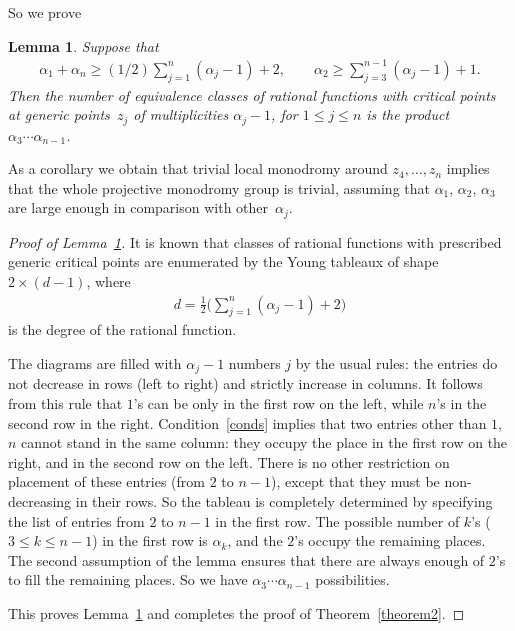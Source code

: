 \documentclass[pdftex]{sigma}
\numberwithin{equation}{section}
\newtheorem{lem}[thm]{Lemma}
 { \theoremstyle{definition}
\newtheorem{Remark}[thm]{Remark} }
\def\lc{,\allowbreak\ldots,\allowbreak}
\begin{document}
So we prove

\begin{lem}\label{lem2}
Suppose that
\begin{gather}\label{conds}
\alpha_1+\alpha_n\geq (1/2)\sum_{j=1}^n(\alpha_j-1)+2,\qquad \alpha_2\geq\sum_{j=3}^{n-1}(\alpha_j-1)+1.
\end{gather}
Then the number of equivalence classes of rational functions with critical points at generic points~$z_j$ of multiplicities $\alpha_j-1$, for $1\leq j\leq n$ is the product $\alpha_3\cdots\alpha_{n-1}$.
\end{lem}

As a corollary we obtain that trivial local monodromy around $z_4\lc z_n$ implies that the whole projective monodromy group is trivial, assuming that $\alpha_1$, $\alpha_2$, $\alpha_3$ are large enough in comparison with
other~$\alpha_j$.

\begin{proof}[Proof of Lemma~\ref{lem2}]It is known \cite{EGSV} that classes of rational functions with prescribed generic critical points are enumerated by the Young tableaux of shape $2\times (d-1)$, where
\begin{gather*}
d=\frac12 \biggl(\sum_{j=1}^n(\alpha_j-1)+2\biggr)
\end{gather*}
is the degree of the rational function.

The diagrams are filled with $\alpha_j-1$ numbers $j$ by the usual rules: the entries do not decrease in rows (left to right) and strictly increase in columns. It follows from this rule that $1$'s can be only in the first row on the left, while $n$'s in the second row in the right. Condition~\eqref{conds} implies that two entries other than $1$, $n$ cannot stand in the same column: they occupy the place in the first row on the right, and in the second row on the left. There is no other restriction on placement of these entries (from $2$ to $n-1$), except that they must be non-decreasing in their rows. So the tableau is completely determined by specifying the list of entries from $2$ to $n-1$ in the first row. The possible number of $k$'s ($3\leq k\leq n-1$) in the first row is $\alpha_k$, and the $2$'s occupy the remaining places. The second assumption of the lemma ensures that there are always enough of $2$'s to fill the remaining places. So we have $\alpha_3\cdots\alpha_{n-1}$ possibilities.

This proves Lemma~\ref{lem2} and completes the proof of Theorem~\ref{theorem2}.
\end{proof}
\end{document}
